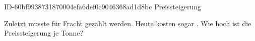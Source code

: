 \begin{exercise}
      {ID-60bf9938731870004efa6def0c9046368ad1d8bc}
      {Preissteigerung}
  \ifproblem\problem\par
    Zuletzt musste für  Fracht  gezahlt werden.
    Heute kosten  sogar . Wie hoch ist die Preissteigerung
    je Tonne?
  \fi
\end{exercise}
